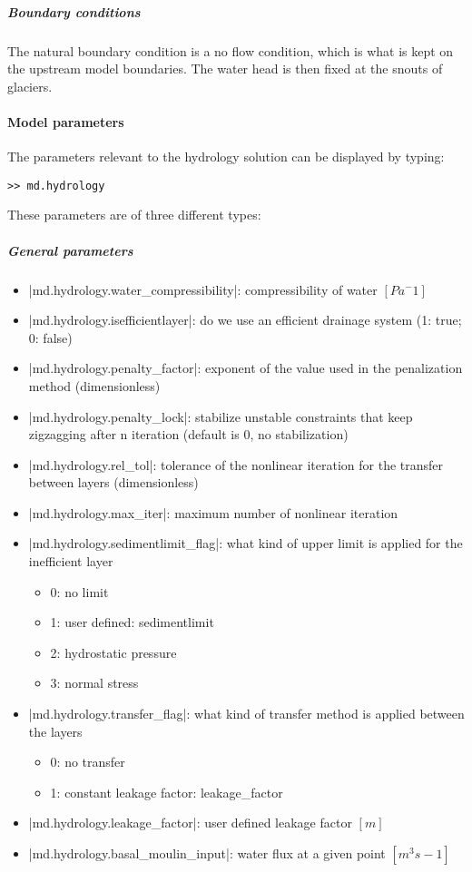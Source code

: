 \subparagraph{Boundary conditions}
The natural boundary condition is a no flow condition, which is what is kept on the upstream model boundaries. The water head is then fixed at the snouts of glaciers.

\paragraph{Model parameters}
The parameters relevant to the hydrology solution can be displayed by typing:
\begin{lstlisting}
>> md.hydrology
\end{lstlisting}

These parameters are of three different types:
\subparagraph{General parameters}
\begin{itemize}
	\item \lstinlinebg|md.hydrology.water_compressibility|: compressibility of water $[Pa^-1]$
	\item \lstinlinebg|md.hydrology.isefficientlayer|: do we use an efficient drainage system (1: true; 0: false)
	\item \lstinlinebg|md.hydrology.penalty_factor|: exponent of the value used in the penalization method (dimensionless)
	\item \lstinlinebg|md.hydrology.penalty_lock|: stabilize unstable constraints that keep zigzagging after n iteration (default is 0, no stabilization)
	\item \lstinlinebg|md.hydrology.rel_tol|: tolerance of the nonlinear iteration for the transfer between layers (dimensionless)
	\item \lstinlinebg|md.hydrology.max_iter|: maximum number of nonlinear iteration
	\item \lstinlinebg|md.hydrology.sedimentlimit_flag|: what kind of upper limit is applied for the inefficient layer
		\begin{itemize}
			\item 0: no limit
			\item 1: user defined: sedimentlimit
			\item 2: hydrostatic pressure
			\item 3: normal stress
		\end{itemize}
	\item \lstinlinebg|md.hydrology.transfer_flag|: what kind of transfer method is applied between the layers
		\begin{itemize}
			\item 0: no transfer
			\item 1: constant leakage factor: leakage\_factor
		\end{itemize}
	\item \lstinlinebg|md.hydrology.leakage_factor|: user defined leakage factor $[m]$
	\item \lstinlinebg|md.hydrology.basal_moulin_input|: water flux at a given point $[m^3 s-1]$
\end{itemize}


